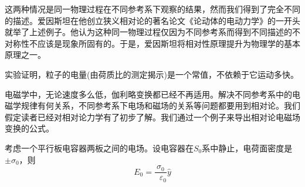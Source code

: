 \documentclass[12pt,a4paper,oneside]{report}
\theoremstyle{definition}
\theoremstyle{remark}
\renewcommand{\v}{\mathop{}\!\varepsilon}
\begin{document}
这两种情况是同一物理过程在不同参考系下观察的结果，然而我们得到了完全不同的描述。爱因斯坦在他创立狭义相对论的著名论文《论动体的电动力学》的一开头就举了上述例子。他认为这种同一物理过程仅因为不同参考系而得到不同描述的不对称性不应该是现象所固有的。于是，爱因斯坦将相对性原理提升为物理学的基本原理之一。

实验证明，粒子的电量(由荷质比的测定揭示)是一个常值，不依赖于它运动多快。

电磁学中，无论速度多么低，伽利略变换都已经不再适用。解决不同参考系中的电磁学规律有何关系，不同参考系下电场和磁场的关系等问题都要用到相对论。我们假定读者已经对相对论力学有了初步了解。我们通过一个例子来导出相对论电磁场变换的公式。

考虑一个平行板电容器两板之间的电场。设电容器在$S_0$系中静止，电荷面密度是$\pm \sigma_0$，则
\[
E_0 = \frac{\sigma_0}{\v_0}\hat{y}
\]
\end{document}
